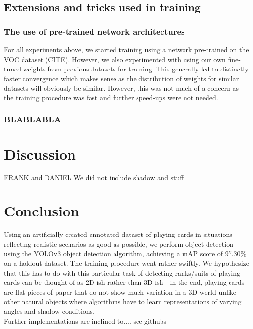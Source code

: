 \documentclass[a4paper]{article}
\begin{document}
\subsection*{Extensions and tricks used in training}
\subsubsection*{The use of pre-trained network architectures}
For all experiments above, we started training using a network pre-trained on the VOC dataset (CITE). However, we also experimented with using our own fine-tuned weights from previous datasets for training. This generally led to distinctly faster convergence which makes sense as the distribution of weights for similar datasets will obviously be similar. However, this was not much of a concern as the training procedure was fast and further speed-ups were not needed.
\subsubsection*{BLABLABLA}
\section{Discussion}
FRANK and DANIEL
We did not include shadow and stuff
\section{Conclusion}
Using an artificially created annotated dataset of playing cards in situations reflecting realistic scenarios as good as possible, we perform object detection using the YOLOv3 object detection algorithm, achieving a mAP score of 97.30\% on a holdout dataset. 
The training procedure went rather swiftly. We hypothesize that this has to do with this particular task of detecting ranks/suits of playing cards can be thought of as 2D-ish rather than 3D-ish - in the end, playing cards are flat pieces of paper that do not show much variation in a 3D-world unlike other natural objects where algorithms have to learn representations of varying angles and shadow conditions. \\
Further implementations are inclined to.... see githubs
\end{document}
